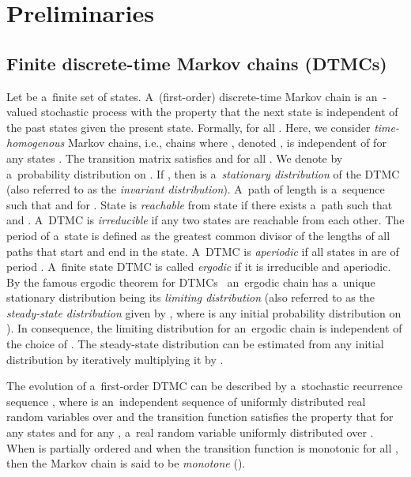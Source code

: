 \documentclass[runningheads,a4paper]{llncs}
\begin{document}
\section{Preliminaries}
\label{sec:pre}


\subsection{Finite discrete-time Markov chains (DTMCs)}
\label{ssec:dtmc}
Let  be a~finite set of states. A~(first-order) discrete-time Markov chain is an~-valued
stochastic process  with the property that the next state is
independent of the past states given the present state. Formally,
 for all . Here, we
consider \emph{time-homogenous} Markov chains, i.e., chains where
, denoted , is independent of  for any states
. The transition matrix  satisfies
 and  for all .
We denote by  a~probability distribution on . If , then  is
a~\emph{stationary distribution} of the DTMC (also referred to as the \emph{invariant
distribution}). A~path of length  is a~sequence  such that
 and  for . State  is
\emph{reachable} from state  if there exists a~path such that  and .
A~DTMC is \emph{irreducible} if any two states are reachable from each other. The period of
a~state is defined as the greatest common divisor of the lengths of all paths that start and end
in the state. A~DTMC is \emph{aperiodic} if all states in  are of period . A~finite state
DTMC is called \emph{ergodic} if it is irreducible and aperiodic. By the famous ergodic theorem
for DTMCs~\cite{Norris98} an~ergodic chain has a~unique stationary distribution being its
\emph{limiting distribution} (also referred to as the \emph{steady-state distribution} given by
, where  is any initial probability distribution on ). In
consequence, the limiting distribution for an~ergodic chain is independent of the choice of
. The steady-state distribution can be estimated from any initial distribution by
iteratively multiplying it by .

The evolution of a~first-order DTMC can be described by a~stochastic recurrence sequence , where  is an~independent sequence of uniformly
distributed real random variables over  and the transition function  satisfies the property that  for any states  and for any , a~real random variable uniformly distributed over . When  is
partially ordered and when the transition function  is monotonic for all , then
the Markov chain is said to be \emph{monotone} (\cite{PW96,BGV08}).
\end{document}
